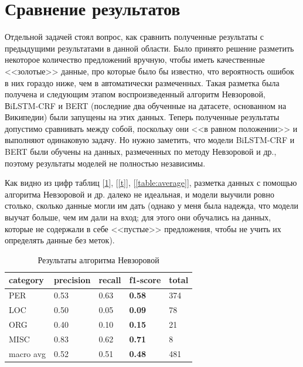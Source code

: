 \section{Сравнение результатов}

Отдельной задачей стоял вопрос, как сравнить полученные результаты с предыдущими результатами в данной области. Было принято решение разметить некоторое количество предложений вручную, чтобы иметь качественные <<золотые>> данные, про которые было бы известно, что вероятность ошибок в них гораздо ниже, чем в автоматически размеченных. Такая разметка была получена и следующим этапом воспроизведенный алгоритм Невзоровой, ВiLSTM-CRF и BERT (последние два обученные на датасете, основанном на Википедии) были запущены на этих данных. Теперь полученные результаты допустимо сравнивать между собой, поскольку они <<в равном положении>> и выполняют одинаковую задачу. Но нужно заметить, что модели BiLSTM-CRF и BERT были обучены на данных, размеченных по методу Невзоровой и др., поэтому результаты моделей не полностью независимы.

Как видно из цифр таблиц [\ref{table:Nevzorova_res_1}], [\ref{t}], [\ref{table:average}], разметка данных с помощью алгоритма Невзоровой и др. далеко не идеальная, и модели выучили ровно столько, сколько данные могли им дать (однако у меня была надежда, что модели выучат больше, чем им дали на вход; для этого они обучались на данных, которые не содержали в себе <<пустые>> предложения, чтобы не учить их определять данные без меток). 

\newpage

\begin{table}[h!]
\begin{tabular}{| l | l | l | l | l |}
\hline


 category &precision  &  recall & \textbf{f1-score} &  total\\
 \hline
 PER& 0.53&0.63&\textbf{0.58}& 374 \\
  \hline
 LOC& 0.50&0.05&\textbf{0.09}&  78 \\
  \hline
 ORG& 0.40&0.10&\textbf{0.15}&  21 \\ 
  \hline
 MISC& 0.83&0.62&\textbf{0.71}&   8 \\ 
 \hline
 \hline

 macro avg& 0.52&0.51&\textbf{0.48}& 481 \\
\hline
\end{tabular}

\caption{Результаты алгоритма Невзоровой}
\label{table:Nevzorova_res_1}
\end{table}

